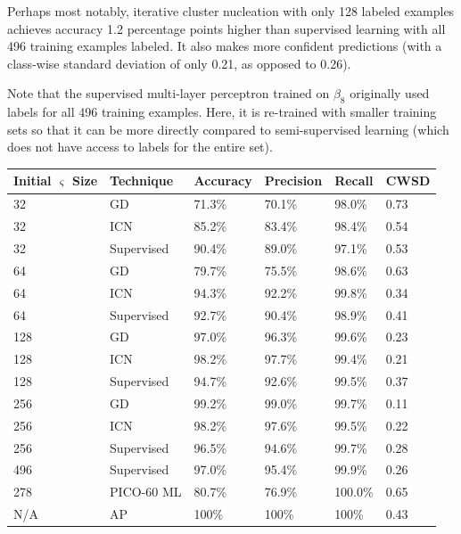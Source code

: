 \documentclass[10pt]{article}
\begin{document}
Perhaps most notably, iterative cluster nucleation with only 128 labeled examples achieves accuracy 1.2 percentage points higher than supervised learning with all 496 training examples labeled. It also makes more confident predictions (with a class-wise standard deviation of only 0.21, as opposed to 0.26).

Note that the supervised multi-layer perceptron trained on $\beta _8$ originally used labels for all 496 training examples. Here, it is re-trained with smaller training sets so that it can be more directly compared to semi-supervised learning (which does not have access to labels for the entire set).

\begin{minipage}{\textwidth}
    \begin{center}
         \label{semi_success_overview}
        \begin{tabular}{|l|l|l|l|l|l|}
            \hline
            Initial $\varsigma$ Size & Technique & Accuracy & Precision & Recall & CWSD \\
            \hline
            32 & GD & 71.3\% & 70.1\% & 98.0\% & 0.73 \\
            \hline
            32 & ICN & 85.2\% & 83.4\% & 98.4\% & 0.54 \\
            \hline
            32 & Supervised & 90.4\% & 89.0\% & 97.1\% & 0.53 \\
            \hline
            64 & GD & 79.7\% & 75.5\% & 98.6\% & 0.63 \\
            \hline
            64 & ICN & 94.3\% & 92.2\% & 99.8\% & 0.34 \\
            \hline
            64 & Supervised & 92.7\% & 90.4\% & 98.9\% & 0.41 \\
            \hline
            128 & GD & 97.0\% & 96.3\% & 99.6\% & 0.23 \\
            \hline
            128 & ICN & 98.2\% & 97.7\% & 99.4\% & 0.21 \\
            \hline
            128 & Supervised & 94.7\% & 92.6\% & 99.5\% & 0.37 \\
            \hline
            256 & GD & 99.2\% & 99.0\% & 99.7\% & 0.11 \\
            \hline
            256 & ICN & 98.2\% & 97.6\% & 99.5\% & 0.22 \\
            \hline
            256 & Supervised & 96.5\% & 94.6\% & 99.7\% & 0.28 \\
            \hline
            496 & Supervised & 97.0\% & 95.4\% & 99.9\% & 0.26 \\
            \hline
            278 & PICO-60 ML & 80.7\% & 76.9\% & 100.0\% & 0.65 \\
            \hline
            N/A & AP & 100\% & 100\% & 100\% & 0.43 \\
            \hline
        \end{tabular}
    \end{center}
\end{minipage}
\end{document}

